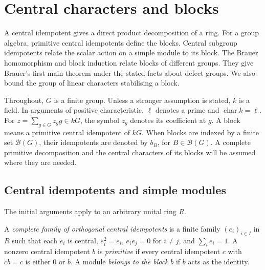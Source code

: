 \chapter{Central characters and blocks}
\label{chap:library:blocks}

A central idempotent gives a direct product decomposition of a ring.
For a group algebra, primitive central idempotents define the blocks.
Central subgroup idempotents relate the scalar action on a simple module
to its block. The Brauer homomorphism and block induction relate blocks
of different groups. They give Brauer's first main theorem under the
stated facts about defect groups. We also bound the group of linear
characters stabilising a block.

Throughout, $G$ is a finite group. Unless a stronger assumption is stated,
$k$ is a field. In arguments of positive characteristic, $\ell$ denotes a
prime and $\operatorname{char}k=\ell$. For
$z=\sum_{g\in G}z_g g\in kG$, the symbol $z_g$ denotes its coefficient at
$g$. A block means a primitive central idempotent of $kG$.
When blocks are indexed by a finite set $\mathcal B(G)$, their idempotents
are denoted by $b_B$, for $B\in\mathcal B(G)$. A complete primitive
decomposition and the central characters of its blocks will be assumed
where they are needed.

\section{Central idempotents and simple modules}
\label{lib:blocks:support}

The initial arguments apply to an arbitrary unital ring $R$.

\begin{definition}
A \emph{complete family of orthogonal central idempotents} is a finite family
$(e_i)_{i\in I}$ in $R$ such that each $e_i$ is central,
$e_i^2=e_i$, $e_i e_j=0$ for $i\ne j$, and $\sum_i e_i=1$.
A nonzero central idempotent $b$ is \emph{primitive} if every central
idempotent $c$ with $cb=c$ is either $0$ or $b$.
A module \emph{belongs to the block} $b$ if $b$ acts as the identity.
\end{definition}

